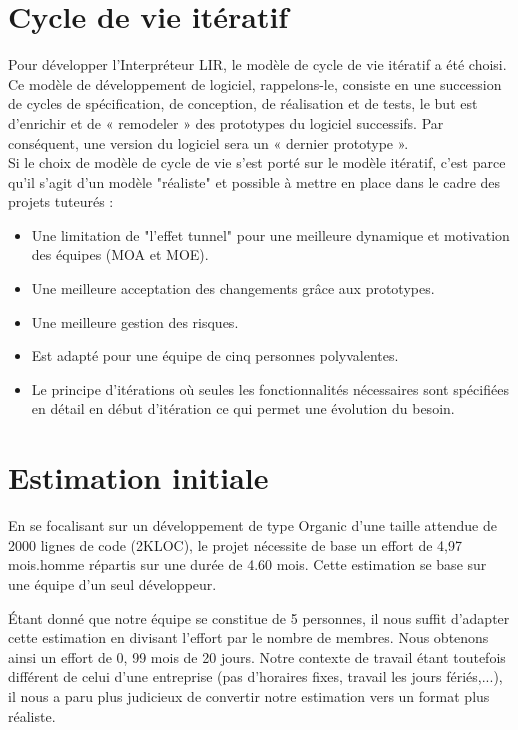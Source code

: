 \documentclass[12pt,a4paper,titlepage,openany]{report}
\begin{document}
    \section{Cycle de vie itératif}
    Pour développer l’Interpréteur LIR, le modèle de cycle de vie itératif a été
    choisi. Ce modèle de développement de logiciel, rappelons-le, consiste en une
    succession de cycles de spécification, de conception, de réalisation et de
    tests, le but est d’enrichir et de « remodeler » des prototypes du logiciel
    successifs. Par conséquent, une version du logiciel sera un « dernier
    prototype ».
    \\Si le choix de modèle de cycle de vie s'est porté sur le modèle itératif,
    c'est parce qu'il s'agit d'un modèle "réaliste" et possible à mettre en place
    dans le cadre des projets tuteurés :

    \begin{itemize}
        \item Une limitation de "l'effet tunnel" pour une meilleure dynamique et motivation des équipes (MOA et MOE).
        \item Une meilleure acceptation des changements grâce aux prototypes.
        \item Une meilleure gestion des risques.
        \item Est adapté pour une équipe de cinq personnes polyvalentes.
        \item Le principe d'itérations où seules les fonctionnalités nécessaires sont spécifiées en détail en début d'itération ce qui permet une évolution du besoin.
    \end{itemize}

    \section{Estimation initiale}
        En se focalisant sur un développement de type Organic d'une taille attendue
        de 2000 lignes de code (2KLOC), le projet nécessite de base un effort de 4,97
        mois.homme répartis sur une durée de 4.60 mois. Cette estimation se base sur
        une équipe d'un seul développeur.

        \'{E}tant donné que notre équipe se constitue de 5 personnes, il nous suffit
        d'adapter cette estimation en divisant l'effort par le nombre de membres. Nous
        obtenons ainsi un effort de 0, 99 mois de 20 jours. Notre contexte de travail
        étant toutefois différent de celui d'une entreprise (pas d'horaires fixes,
        travail les jours fériés,...), il nous a paru plus judicieux de convertir
        notre estimation vers un format plus réaliste.
\end{document}
